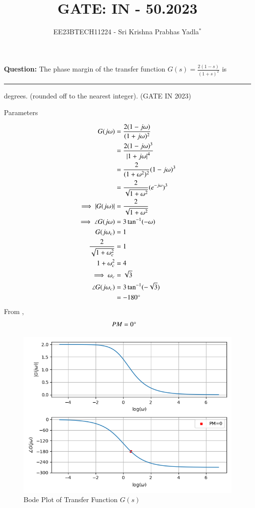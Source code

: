 \documentclass[journal,12pt,twocolumn]{IEEEtran}
\theoremstyle{remark}
\begin{document}

\vspace{3cm}

\title{GATE: IN - 50.2023}
\author{EE23BTECH11224 - Sri Krishna Prabhas Yadla$^{*}$%
}
\maketitle
\newpage
\bigskip

\renewcommand{\thefigure}{\arabic{figure}}
\renewcommand{\thetable}{\arabic{table}}


\vspace{3cm}
\textbf{Question:} The phase margin of the transfer function $G(s) = \frac{2(1-s)}{(1+s)^2}$ is \rule{1cm}{0.15mm} degrees. (rounded off to the nearest integer). \hfill (GATE IN 2023)\\
\solution
\begin{table}[htbp]
	\centering
	\def\arraystrech{1.5}
	
	\caption{Parameters}
	\label{tab:parameters}
\end{table}
\begin{align}
	G(j\omega) &= \frac{2(1-j\omega)}{(1+j\omega)^2} \\
	&= \frac{2(1-j\omega)^3}{\left\vert1+j\omega\right\vert^4}\\
	&= \frac{2}{(1+\omega^2)^2}(1-j\omega)^3 \\
	&= \frac{2}{\sqrt{1+\omega^2}}(e^{-j\omega})^3 \\
	\implies \left\vert G(j\omega)\right\vert &= \frac{2}{\sqrt{1+\omega^2}} \\
	\implies \angle G(j\omega) &= 3\tan^{-1}(-\omega) \\
	G(j\omega_c) &= 1 \\
	\frac{2}{\sqrt{1+\omega_c^2}} &= 1 \\
	1+\omega_c^2 &= 4 \\
	\implies \omega_c &= \sqrt{3} \\
	\angle G(j\omega_c) &= 3\tan^{-1}(-\sqrt{3}) \\
	&= -180\degree
\end{align}
From ,
\begin{align}
	PM &= 0\degree
\end{align}
\begin{figure}[htbp]
	\includegraphics[width=\columnwidth]{figs/bode.png}
	\caption{Bode Plot of Transfer Function $G(s)$}
	\label{fig:bode}
\end{figure}
\end{document}
